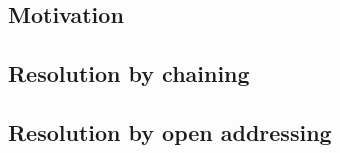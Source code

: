 \subsection{Motivation}

\subsection{Resolution by chaining}

\subsection{Resolution by open addressing}